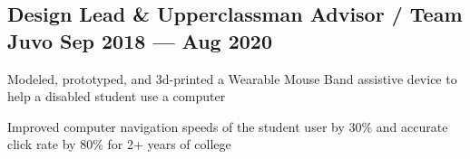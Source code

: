 \subsection{{Design Lead \& Upperclassman Advisor / Team Juvo  \hfill Sep 2018 --- Aug 2020}}
\begin{zitemize}
	\item Modeled, prototyped, and 3d-printed a Wearable Mouse Band assistive device to help a disabled student use a
	computer
	\item Improved computer navigation speeds of the student user by 30\% and accurate click rate by 80\% for 2+ years
	of college
\end{zitemize}


